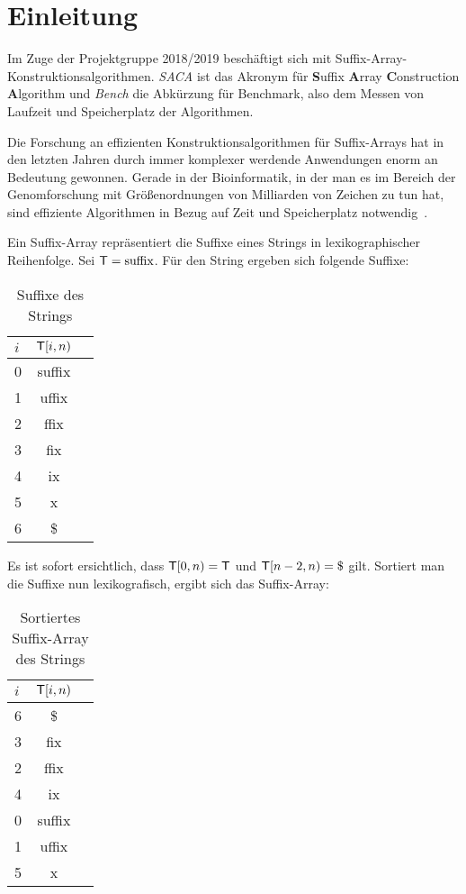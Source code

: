 \chapter{Einleitung}

Im  Zuge der Projektgruppe 2018/2019 beschäftigt sich
\emph{\sacabench} mit Suffix-Array-Konstruktionsalgorithmen. \emph{SACA} ist das Akronym für
\textbf{S}uffix \textbf{A}rray \textbf{C}on\-struction \textbf{A}lgorithm und \emph{Bench} die Abkürzung für Benchmark,
also dem Messen von Laufzeit und Speicherplatz der Algorithmen.

Die Forschung an effizienten Konstruktionsalgorithmen für Suffix-Arrays hat in den letzten Jahren durch
immer komplexer werdende Anwendungen enorm an Bedeutung gewonnen.
Gerade in der Bioinformatik,
in der man es im Bereich der Genomforschung mit Größenordnungen von Milliarden von Zeichen zu tun hat,
sind effiziente Algorithmen in Bezug auf Zeit und Speicherplatz notwendig~\cite[Kap.~1]{saca:6}.

Ein Suffix-Array repräsentiert die Suffixe eines Strings  in lexikographischer Reihenfolge.
Sei $\inputtext{} = \text{suffix}$. Für den String  ergeben sich folgende Suffixe:
%

\begin{table}[htb]
\centering
  \begin{tabular}{ | l | c | r }
    \hline
        $i$ & $\inputtext{}[i, n)$ \\ \hline
        0 & suffix \\ \hline
        1 & uffix \\ \hline
        2 & ffix \\ \hline
        3 & fix \\ \hline
        4 & ix \\ \hline
        5 & x \\ \hline
        6 & \$ \\
    \hline

  \end{tabular}
  \caption{Suffixe des Strings }
\end{table}

%
Es ist sofort ersichtlich, dass $\inputtext{}[0, n) = \inputtext{}$ und $\inputtext{}[n-2, n)=\$$ gilt.
\newpage \noindent Sortiert man die Suffixe nun lexikografisch, ergibt sich das Suffix-Array:
%
\begin{table}[H]
\centering
  \begin{tabular}{ | l | c | r }
    \hline
        $i$ & $\inputtext{}[i, n)$ \\ \hline
        6 & \$ \\ \hline
        3 & fix \\ \hline
        2 & ffix \\ \hline
        4 & ix \\ \hline
        0 & suffix \\ \hline
        1 & uffix \\ \hline
        5 & x \\
    \hline
  \end{tabular}
  \caption{Sortiertes Suffix-Array des Strings }
\end{table}


